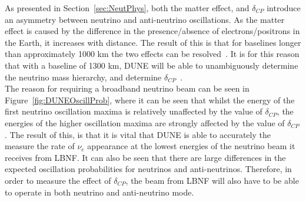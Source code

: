As presented in Section~\ref{sec:NeutPhys}, both the matter effect, and $\delta_{CP}$ introduce an asymmetry between neutrino and anti-neutrino oscillations. As the matter effect is caused by the difference in the presence/absence of electrons/positrons in the Earth, it increases with distance. The result of this is that for baselines longer than approximately 1000 km the two effects can be resolved~\citep{Bass:2013vcg}. It is for this reason that with a baseline of 1300 km, DUNE will be able to unambiguously determine the neutrino mass hierarchy, and determine $\delta_{CP}$~\citep{Diwan:2004bt}. \\

The reason for requiring a broadband neutrino beam can be seen in Figure~\ref{fig:DUNEOscillProb}, where it can be seen that whilst the energy of the first neutrino oscillation maxima is relatively unaffected by the value of $\delta_{CP}$, the energies of the higher oscillation maxima are strongly affected by the value of $\delta_{CP}$. The result of this, is that it is vital that DUNE is able to accurately the measure the rate of $\nu_e$ appearance at the lowest energies of the neutrino beam it receives from LBNF. It can also be seen that there are large differences in the expected oscillation probabilities for neutrinos and anti-neutrinos. Therefore, in order to measure the effect of $\delta_{CP}$, the beam from LBNF will also have to be able to operate in both neutrino and anti-neutrino mode. \\

